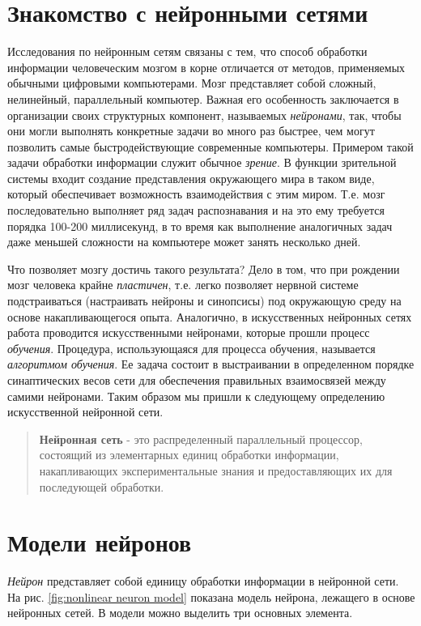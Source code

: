 \documentclass[a4paper,12pt]{report}
\begin{document}
\section{Знакомство с нейронными сетями}
Исследования по нейронным сетям связаны с тем, что способ обработки
информации человеческим мозгом в корне отличается от методов,
применяемых обычными цифровыми компьютерами. Мозг представляет собой
сложный, нелинейный, параллельный компьютер. Важная его особенность
заключается в организации своих структурных компонент, называемых
\textit{нейронами}, так, чтобы они могли выполнять конкретные задачи
во много раз быстрее, чем могут позволить самые быстродействующие
современные компьютеры. Примером такой задачи обработки информации
служит обычное \textit{зрение}. В функции зрительной системы входит
создание представления окружающего мира в таком виде, который
обеспечивает возможность взаимодействия с этим миром. Т.е. мозг
последовательно выполняет ряд задач распознавания и на это ему
требуется порядка 100-200 миллисекунд, в то время как выполнение
аналогичных задач даже меньшей сложности на компьютере может занять
несколько дней.

Что позволяет мозгу достичь такого результата? Дело в том, что
при рождении мозг человека крайне \textit{пластичен}, т.е. легко позволяет
нервной системе подстраиваться (настраивать нейроны и синопсисы) под окружающую среду на основе
накапливающегося опыта. Аналогично, в искусственных нейронных сетях
работа проводится искусственными нейронами, которые прошли процесс
\textit{обучения}. Процедура, использующаяся для процесса обучения,
называется \textit{алгоритмом обучения}. Ее задача состоит в
выстраивании в определенном порядке синаптических весов сети для
обеспечения правильных взаимосвязей между самими нейронами. Таким
образом мы пришли к следующему определению искусственной нейронной
сети.

\begin{quote}
    \textbf{Нейронная сеть} - это распределенный параллельный
    процессор, состоящий из элементарных единиц обработки информации,
    накапливающих экспериментальные знания и предоставляющих их для
    последующей обработки.
\end{quote}

\section{Модели нейронов}
\textit{Нейрон} представляет собой единицу обработки информации в
нейронной сети. На рис. \ref{fig:nonlinear neuron model} показана модель нейрона, лежащего в
основе нейронных сетей. В модели можно выделить три основных элемента.
\end{document}
